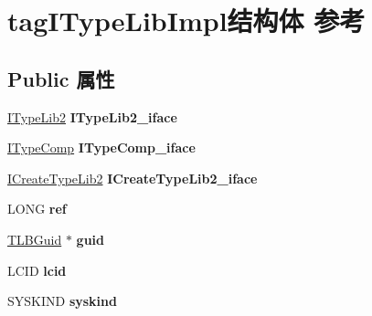 \hypertarget{structtag_i_type_lib_impl}{}\section{tag\+I\+Type\+Lib\+Impl结构体 参考}
\label{structtag_i_type_lib_impl}
\subsection*{Public 属性}
\begin{DoxyCompactItemize}
\item 
\mbox{\label{structtag_i_type_lib_impl_a4dd817e85a7d7a09bd3c678bdee603c0}} 
\hyperlink{interface_i_type_lib2}{I\+Type\+Lib2} {\bfseries I\+Type\+Lib2\+\_\+iface}
\item 
\mbox{\label{structtag_i_type_lib_impl_aed8f07921da78b6e5cb84761dbbfb954}} 
\hyperlink{interface_i_type_comp}{I\+Type\+Comp} {\bfseries I\+Type\+Comp\+\_\+iface}
\item 
\mbox{\label{structtag_i_type_lib_impl_a41a9d06e8a1d4cd8bbbd9b4fc21b8372}} 
\hyperlink{interface_i_create_type_lib2}{I\+Create\+Type\+Lib2} {\bfseries I\+Create\+Type\+Lib2\+\_\+iface}
\item 
\mbox{\label{structtag_i_type_lib_impl_af6443d072332e5c18cf284335c203193}} 
L\+O\+NG {\bfseries ref}
\item 
\mbox{\label{structtag_i_type_lib_impl_a811a9d1bc5da5b24b3315b6f0b49d782}} 
\hyperlink{structtag_t_l_b_guid}{T\+L\+B\+Guid} $\ast$ {\bfseries guid}
\item 
\mbox{\label{structtag_i_type_lib_impl_ac0b86fb8a1cde54a9ad0b2f9ed7416be}} 
L\+C\+ID {\bfseries lcid}
\item 
\mbox{\label{structtag_i_type_lib_impl_a6953bd84a98b0131ce624f8c1eac5cd1}} 
S\+Y\+S\+K\+I\+ND {\bfseries syskind}
\item 
\mbox{\label{structtag_i_type_lib_impl_a4ae3993960541804b788f403c30fff50}} 

\end{DoxyCompactItemize}
